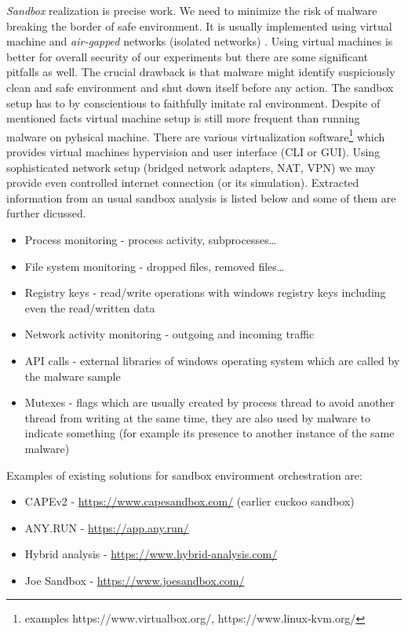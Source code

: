 \emph{Sandbox} realization is precise work. We need to minimize the risk of malware breaking the border of safe environment. It is usually implemented using virtual machine and \emph{air-gapped} networks (isolated networks) \cite{Sikorski2012}. Using virtual machines is better for overall security of our experiments but there are some significant pitfalls as well. The crucial drawback is that malware might identify suspiciously clean and safe environment and shut down itself before any action. The sandbox setup has to by conscientious to faithfully imitate ral environment. Despite of mentioned facts virtual machine setup is still more frequent than running malware on pyhsical machine. There are various virtualization software\footnote{examples https://www.virtualbox.org/, https://www.linux-kvm.org/} which provides virtual machines hypervision and user interface (CLI or GUI). Using sophisticated network setup (bridged network adapters, NAT, VPN) we may provide even controlled internet connection (or its simulation). Extracted information from an usual sandbox analysis is listed below and some of them are further dicussed.

\begin{itemize}
  \item Process monitoring - process activity, subprocesses\dots
  \item File system monitoring - dropped files, removed files\dots
  \item Registry keys - read/write operations with windows registry keys including even the read/written data
  \item Network activity monitoring - outgoing and incoming traffic
  \item API calls - external libraries of windows operating system which are called by the malware sample
  \item Mutexes - flags which are usually created by process thread to avoid another thread from writing at the same time, they are also used by malware to indicate something (for example its presence to another instance of the same malware)
\end{itemize}


Examples of existing solutions for sandbox environment orchestration are:
\begin{itemize}
  \item CAPEv2 - \url{https://www.capesandbox.com/} (earlier cuckoo sandbox)
  \item ANY.RUN - \url{https://app.any.run/}
  \item Hybrid analysis - \url{https://www.hybrid-analysis.com/}
  \item Joe Sandbox - \url{https://www.joesandbox.com/}
\end{itemize}

